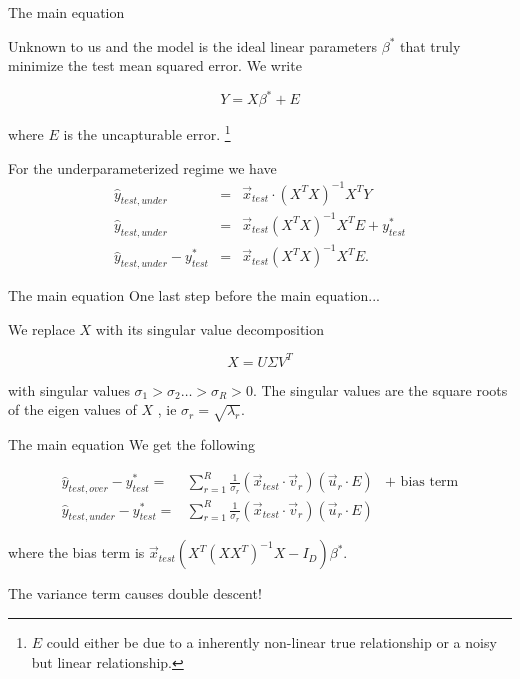 \documentclass{beamer}
\begin{document}
\begin{frame}{The main equation}

    Unknown to us and the model is the ideal linear parameters $\beta^*$ that truly minimize the test mean squared error. We write 

    $$Y=X\beta^* + E$$

    where $E$ is the uncapturable error. \footnote{$E$ could either be due to a inherently non-linear true relationship or a noisy but linear relationship.}

    \pause

    For the underparameterized regime we have
    \begin{eqnarray*}
        \hat{y}_{test,under} & = & \vec{x}_{test} \cdot (X^T X)^{-1}X^T Y \\
        \hat{y}_{test,under} & = & \vec{x}_{test} (X^T X)^{-1} X^T E  + y^*_{test} \\
        \hat{y}_{test,under} - y^*_{test} & = & \vec{x}_{test} (X^T X)^{-1} X^T E.
    \end{eqnarray*}

\end{frame}

\begin{frame}{The main equation}
    One last step before the main equation...

    \hspace{5cm}
    \pause

    We replace $X$ with its singular value decomposition

    $$X = U \Sigma V^T$$

    with singular values $\sigma_1 > \sigma_2 \dots > \sigma_R > 0.$ The singular values are the square roots of the eigen values of $X$ , ie $\sigma_r=\sqrt{\lambda_r}.$
\end{frame}

\begin{frame}{The main equation}
    We get the following

    \begin{eqnarray*}
        \hat{y}_{test,over} - y^*_{test} = & \sum_{r=1}^R \frac{1}{\sigma_r}(\vec{x}_{test} \cdot \vec{v}_r)(\vec{u}_r \cdot E) & + \text{ bias term}\\
        \hat{y}_{test,under}- y^*_{test} = & \sum_{r=1}^R \frac{1}{\sigma_r}(\vec{x}_{test} \cdot \vec{v}_r)(\vec{u}_r \cdot E) &
    \end{eqnarray*}

    where the bias term is $\vec{x}_{test} (X^T (XX^T)^{-1}X-I_D)\beta^*$.

    \hfill
    \pause

    The variance term causes double descent!

\end{frame}
\end{document}
